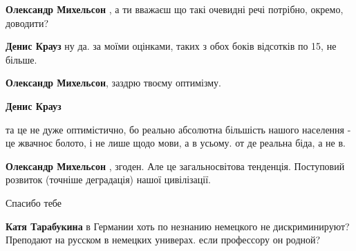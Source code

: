 \begin{itemize}
\begin{itemize}
\textbf{Олександр Михельсон} ,
а ти вважаєш що такі очевидні речі потрібно, окремо, доводити?

 

\textbf{Денис Крауз} ну да. за моїми оцінками, таких з обох боків відсотків по 15, не більше.

 
\textbf{Олександр Михельсон}, заздрю твоєму оптимізму.

 

\textbf{Денис Крауз} 

та це не дуже оптимістично, бо реально абсолютна більшість нашого населення -
це жвачноє болото, і не лише щодо мови, а в усьому. от де реальна біда, а не в.


 
\textbf{Олександр Михельсон} , згоден. Але це загальносвітова тенденція. Поступовий розвиток (точніше деградація) нашої цивілізації.
\end{itemize}


Спасибо тебе 🖤

\begin{itemize}
 

\textbf{Катя Тарабукина} в Германии хоть по незнанию немецкого не дискриминируют? Преподают на русском в немецких универах. если профессору он родной?


\end{itemize}
\end{itemize}
